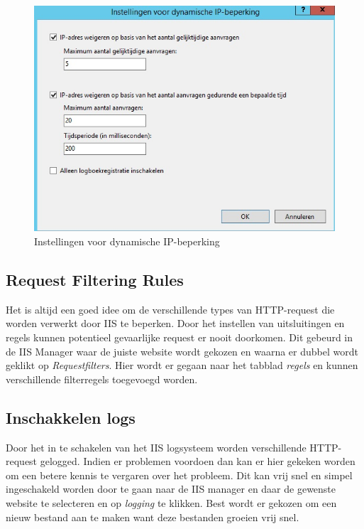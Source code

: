 \documentclass[pdftex,a4paper,12pt]{report}
\begin{document}
\begin{figure}[H]
\begin{center}
\includegraphics[scale=0.60]{img/IIS_Restrictie}
\end{center}
\label{img:IISRestrictie}
\caption{Instellingen voor dynamische IP-beperking}
\end{figure}

\subsection{Request Filtering Rules}
Het is altijd een goed idee om de verschillende types van HTTP-request die worden verwerkt door IIS te beperken. Door het instellen van uitsluitingen en regels kunnen potentieel gevaarlijke request er nooit doorkomen. Dit gebeurd in de IIS Manager waar de juiste website wordt gekozen en waarna er dubbel wordt geklikt op \textit{Requestfilters}. Hier wordt er gegaan naar het tabblad \textit{regels} en kunnen verschillende filterregels toegevoegd worden.\citep{Darmanin2014} \citep{Microsoft2013}

\subsection{Inschakkelen logs}
Door het in te schakelen van het IIS logsysteem worden verschillende HTTP-request gelogged. Indien er problemen voordoen dan kan er hier gekeken worden om een betere kennis te vergaren over het probleem. Dit kan vrij snel en simpel ingeschakeld worden door te gaan naar de IIS manager en daar de gewenste website te selecteren en op \textit{logging} te klikken. Best wordt er gekozen om een nieuw bestand aan te maken want deze bestanden groeien vrij snel. \citep{Darmanin2014} \citep{Microsoft2013}
\end{document}
